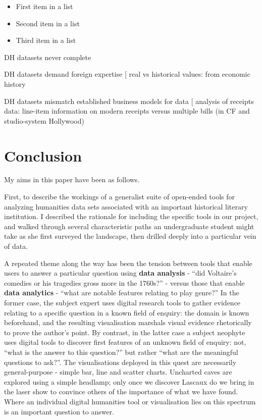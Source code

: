\documentclass[	DIV=calc,%
							paper=a4,%
							fontsize=11pt,%
							twocolumn]{scrartcl}	 					%
\begin{document}
\begin{itemize}
	\item First item in a list
	\item Second item in a list
	\item Third item in a list
\end{itemize}

DH datasets never complete

DH datasets demand foreign expertise
  [ real vs historical values: from economic history

DH datasets mismatch established business models for data
  [ analysis of receipts data: line-item information on modern receipts versus multiple bills (in CF and studio-system Hollywood)

\section*{Conclusion}

My aims in this paper have been as follows.

First, to describe the workings of a generalist suite of open-ended tools for analyzing humanities data sets associated with an important historical literary institution.  I described the rationale for including the specific tools in our project, and walked through several characteristic paths an undergraduate student might take as she first surveyed the landscape, then drilled deeply into a particular vein of data.

A repeated theme along the way has been the tension between tools that enable users to answer a particular question using \textbf{data analysis} - ``did Voltaire's comedies or his tragedies gross more in the 1760s?'' - versus those that enable \textbf{data analytics} - ``what are notable features relating to play genre?''  In the former case, the subject expert uses digital research tools to gather evidence relating to a specific question in a known field of enquiry: the domain is known beforehand, and the resulting visualisation marshals visual evidence rhetorically to prove the author's point.  By contrast, in the latter case a subject neophyte uses digital tools to discover first features of an unknown field of enquiry: not, ``what is the answer to this question?'' but rather ``what are the meaningful questions to ask?''.  The visualisations deployed in this quest are necessarily general-purpose - simple bar, line and scatter charts.  Uncharted caves are explored using a simple headlamp; only once we discover Lascaux do we bring in the laser show to convince others of the importance of what we have found.  Where an individual digital humanities tool or visualisation lies on this spectrum is an important question to answer.
\end{document}
